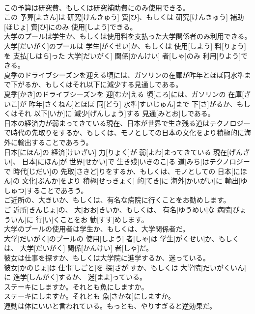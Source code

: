 \documentclass[8pt]{extreport}
\begin{document}
\begin{CJK}{UTF8}{min}
\\	この予算は研究費、もしくは研究補助費にのみ使用できる。	
\\	この 予算[よさん]は 研究[けんきゅう] 費[ひ]、もしくは 研究[けんきゅう] 補助[ほじょ] 費[ひ]にのみ 使用[しよう]できる。
\\	大学のプールは学生か、もしくは使用料を支払った大学関係者のみ利用できる。	
\\	大学[だいがく]のプールは 学生[がくせい]か、もしくは 使用[しよう] 料[りょう]を 支払[しはら]った 大学[だいがく] 関係[かんけい] 者[しゃ]のみ 利用[りよう]できる。
\\	夏季のドライブシーズンを迎える頃には、ガソリンの在庫が昨年とほぼ同水準まで下がるか、もしくはそれ以下に減少する見通しである。	
\\	夏季[かき]のドライブシーズンを 迎[むか]える 頃[ころ]には、ガソリンの 在庫[ざいこ]が 昨年[さくねん]とほぼ 同[どう] 水準[すいじゅん]まで 下[さ]がるか、もしくはそれ 以下[いか]に 減少[げんしょう]する 見通[みとお]しである。
\\	日本の経済力が弱まってきている現在、日本が世界で生き残る道はテクノロジーで時代の先取りをするか、もしくは、モノとしての日本の文化をより積極的に海外に輸出することであろう。	
\\	日本[にほん]の 経済[けいざい] 力[りょく]が 弱[よわ]まってきている 現在[げんざい]、 日本[にほん]が 世界[せかい]で 生き残[いきのこ]る 道[みち]はテクノロジーで 時代[じだい]の 先取[さきど]りをするか、もしくは、モノとしての 日本[にほん]の 文化[ぶんか]をより 積極[せっきょく] 的[てき]に 海外[かいがい]に 輸出[ゆしゅつ]することであろう。
\\	ご近所の、大きいか、もしくは、有名な病院に行くことをお勧めします。	
\\	ご 近所[きんじょ]の、 大[おお]きいか、もしくは、 有名[ゆうめい]な 病院[びょういん]に 行[い]くことをお 勧[すす]めします。
\\	大学のプールの使用者は学生か、もしくは、大学関係者だ。	
\\	大学[だいがく]のプールの 使用[しよう] 者[しゃ]は 学生[がくせい]か、もしくは、 大学[だいがく] 関係[かんけい] 者[しゃ]だ。
\\	彼女は仕事を探すか、もしくは大学院に進学するか、迷っている。	
\\	彼女[かのじょ]は 仕事[しごと]を 探[さが]すか、もしくは 大学院[だいがくいん]に 進学[しんがく]するか、 迷[まよ]っている。
\\	ステーキにしますか。それとも魚にしますか。	
\\	ステーキにしますか。それとも 魚[さかな]にしますか。
\\	運動は体にいいと言われている。もっとも、やりすぎると逆効果だ。	

\end{CJK}
\end{document}
